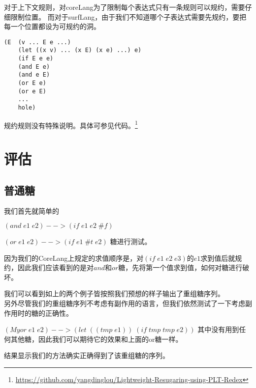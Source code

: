 对于上下文规则，对coreLang为了限制每个表达式只有一条规则可以规约，需要仔细限制位置。
而对于surfLang，由于我们不知道哪个子表达式需要先规约，要把每一个位置都设为可规约的洞。
\begin{verbatim}
(E  (v ... E e ...)
	(let ((x v) ... (x E) (x e) ...) e)
	(if E e e)
	(and E e)
	(and e E)
	(or E e)
	(or e E)
	...
	hole)
\end{verbatim}

规约规则没有特殊说明。具体可参见代码。\footnote{\url{https://github.com/yangdinglou/Lightweight-Resugaring-using-PLT-Redex}}

\pagebreak
\section{评估}

\subsection{普通糖}

我们首先就简单的

$(and\;e1\;e2)-->(if\;e1\;e2\;\#f)$

$(or\;e1\;e2)-->(if\;e1\;\#t\;e2)$
糖进行测试。

因为我们的CoreLang上规定的求值顺序是，对$(if \;e1\;e2\;e3)$的$e1$求到值后就规约，因此我们应该看到的是对$and$和$or$糖，先将第一个值求到值，如何对糖进行破坏。



我们可以看到如上的两个例子皆按照我们预想的样子输出了重组糖序列。\\[6pt]

另外尽管我们的重组糖序列不考虑有副作用的语言，但我们依然测试了一下考虑副作用时的糖的正确性。

$(Myor\;e1\;e2)-->(let\;((tmp\;e1))\;(if\;tmp\;tmp\;e2))$
其中没有用到任何其他糖，因此我们可以期待它的效果和上面的or糖一样。

结果显示我们的方法确实正确得到了该重组糖的序列。

